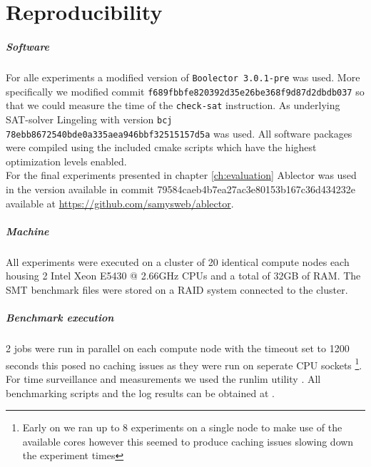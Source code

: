 
\chapter{Reproducibility}
\label{sec:appendix:reproducibility}
\paragraph{Software}
For alle experiments a modified version of \texttt{Boolector 3.0.1-pre} was used.
More specifically we modified commit \texttt{f689fbbfe820392d35e26be368f9d87d2dbdb037} so that we could measure the time of the \texttt{check-sat} instruction.
As underlying SAT-solver Lingeling with version \texttt{bcj 78ebb8672540bde0a335aea946bbf32515157d5a} was used.
All software packages were compiled using the included cmake scripts which have the highest optimization levels enabled.\\
For the final experiments presented in chapter \ref{ch:evaluation} Ablector was used in the version available in commit 79584caeb4b7ea27ac3e80153b167c36d434232e available at \url{https://github.com/samysweb/ablector}.

\paragraph{Machine}
All experiments were executed on a cluster of 20 identical compute nodes each housing 2 Intel Xeon E5430 @ 2.66GHz CPUs and a total of 32GB of RAM.
The SMT benchmark files were stored on a RAID system connected to the cluster.

\paragraph{Benchmark execution}
2 jobs were run in parallel on each compute node with the timeout set to 1200 seconds
this posed no caching issues as they were run on seperate CPU sockets
\footnote{Early on we ran up to 8 experiments on a single node to make use of the available cores however this seemed to produce caching issues slowing down the experiment times}.
For time surveillance and measurements we used the runlim utility \cite{runlim}.
All benchmarking scripts and the log results can be obtained at .

\renewcommand{\simplechapterdelim}{.}
\listoffigures